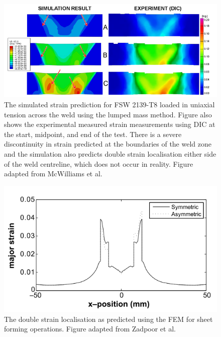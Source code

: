 \begin{figure}[h!]
	\centering
	\includegraphics[width=1\linewidth]{Figures/LiteratureReview/LumpedMassMcwilliams}
	\caption[Lumped mass prediction]{The simulated strain prediction for FSW 2139-T8 loaded in uniaxial tension across the weld using the lumped mass method. Figure also shows the experimental measured strain measurements using DIC at the start, midpoint, and end of the test. There is a severe discontinuity in strain predicted at the boundaries of the weld zone and the simulation also predicts double strain localisation either side of the weld centreline, which does not occur in reality. Figure adapted from McWilliams et al. \cite{McWilliams2013}}
	\label{fig:LumpedMassMcwilliams}
\end{figure}

\begin{figure}[h!]
	\centering
	\includegraphics[width=0.75\linewidth]{Figures/LiteratureReview/DoubleStrainLocalisation}
	\caption[Strain prediction under biaxial loading]{The double strain localisation as predicted using the FEM for sheet forming operations. Figure adapted from Zadpoor et al. \cite{Zadpoor2009}}
	\label{fig:DoubleStrainLocalisation}
\end{figure}

